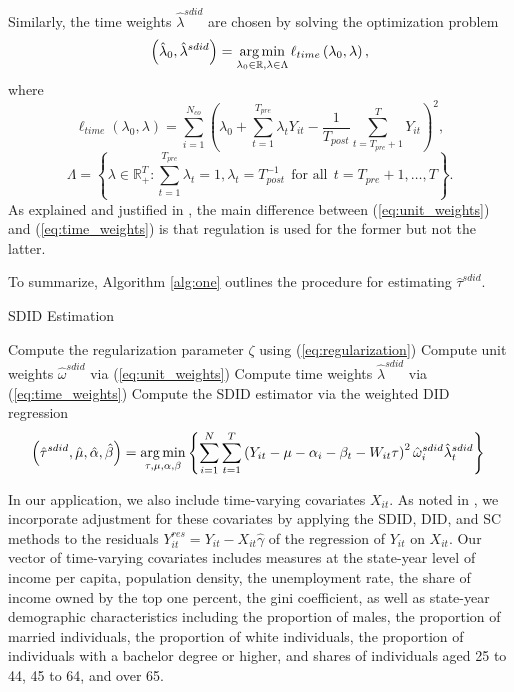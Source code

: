 \documentclass[../Main.tex]{subfiles}
\begin{document}
Similarly, the time weights $\hat{\lambda}^{sdid}$ are chosen by solving the optimization problem
\begin{equation} \label{eq:time_weights}
    \left(\hat{\lambda}_0,\hat{\lambda}^{sdid}\right)=\operatorname*{arg\,min}_{\lambda_0\in\mathbb{R},\lambda\in\Lambda}\ell_{time}\left(\lambda_0,\lambda\right),
\end{equation}
where
\begin{equation*}
    \ell_{time}\left(\lambda_0,\lambda\right)=\sum_{i=1}^{N_{co}}\left(\lambda_0+\sum_{t=1}^{T_{pre}}\lambda_tY_{it}-\frac{1}{T_{post}}\sum_{t=T_{pre}+1}^TY_{it}\right)^2,
\end{equation*}
\begin{equation*}
    \Lambda=\left\{\lambda\in\mathbb{R}_+^T:\sum_{t=1}^{T_{pre}}\lambda_t=1,\lambda_t=T_{post}^{-1} ~~ \text{for all} ~~ t=T_{pre}+1,\dots ,T \right\}.
\end{equation*}
As explained and justified in \citet{arkhangelsky2021synthetic}, the main difference between (\ref{eq:unit_weights}) and (\ref{eq:time_weights}) is that regulation is used for the former but not the latter.

To summarize, Algorithm \ref{alg:one} outlines the procedure for estimating $\hat{\tau}^{sdid}$.
\vspace{.25cm}
\begin{center}
\begin{algorithm}[H]
\caption{SDID Estimation}\label{alg:one}
Compute the regularization parameter $\zeta$ using (\ref{eq:regularization})\;
Compute unit weights $\hat{\omega}^{sdid}$ via (\ref{eq:unit_weights})\;
Compute time weights $\hat{\lambda}^{sdid}$ via (\ref{eq:time_weights})\;
Compute the SDID estimator via the weighted DID regression
\begin{equation*}
    \left(\hat{\tau}^{sdid},\hat{\mu},\hat{\alpha},\hat{\beta}\right)=\operatorname*{arg\,min}_{\tau,\mu,\alpha,\beta}\left\{\sum_{i=1}^N\sum_{t=1}^T\left(Y_{it}-\mu-\alpha_i-\beta_t-W_{it}\tau\right)^2\hat{\omega}_i^{sdid}\hat{\lambda}_t^{sdid}\right\}\;
\end{equation*}
\end{algorithm}
\end{center}
$~$\\
\indent In our application, we also include time-varying covariates $X_{it}$. As noted in \citet{arkhangelsky2021synthetic}, we incorporate adjustment for these covariates by applying the SDID, DID, and SC methods to the residuals $Y_{it}^{res}=Y_{it}-X_{it}\hat{\gamma}$ of the regression of $Y_{it}$ on $X_{it}$. Our vector of time-varying covariates includes measures at the state-year level of income per capita, population density, the unemployment rate, the share of income owned by the top one percent, the gini coefficient, as well as state-year demographic characteristics including the proportion of males, the proportion of married individuals, the proportion of white individuals, the proportion of individuals with a bachelor degree or higher, and shares of individuals aged 25 to 44, 45 to 64, and over 65.
\end{document}

